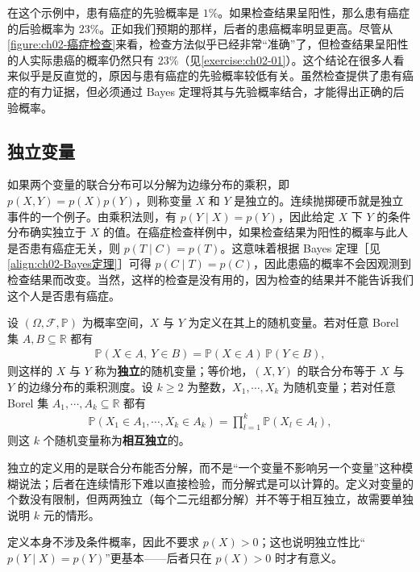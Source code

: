 \documentclass[../../main.tex]{subfiles}
\begin{document}
在这个示例中，患有癌症的先验概率是 $1\%$。如果检查结果呈阳性，那么患有癌症的后验概率为 $23\%$。正如我们预期的那样，后者的患癌概率明显更高。尽管从\cref{figure:ch02-癌症检查}来看，检查方法似乎已经非常“准确”了，但检查结果呈阳性的人实际患癌的概率仍然只有 $23\%$（见\cref{exercise:ch02-01}）。这个结论在很多人看来似乎是反直觉的，原因与患有癌症的先验概率较低有关。虽然检查提供了患有癌症的有力证据，但必须通过 Bayes 定理将其与先验概率结合，才能得出正确的后验概率。

\subsection{独立变量}\label{subsection:ch02-独立变量}

如果两个变量的联合分布可以分解为边缘分布的乘积，即 $p(X,Y)=p(X)p(Y)$，则称变量 $X$ 和 $Y$ 是独立的。连续抛掷硬币就是独立事件的一个例子。由乘积法则，有 $p(Y\mid X)=p(Y)$，因此给定 $X$ 下 $Y$ 的条件分布确实独立于 $X$ 的值。在癌症检查样例中，如果检查结果为阳性的概率与此人是否患有癌症无关，则 $p(T\mid C)=p(T)$。这意味着根据 Bayes 定理［见\eqref{align:ch02-Bayes定理}］可得 $p(C\mid T)=p(C)$，因此患癌的概率不会因观测到检查结果而改变。当然，这样的检查是没有用的，因为检查的结果并不能告诉我们这个人是否患有癌症。

\begin{definition}[独立变量]\label{definition:ch02-独立变量}
设 $(\Omega,\mathcal{F},\mathbb{P})$ 为概率空间，$X$ 与 $Y$ 为定义在其上的随机变量。若对任意 Borel 集 $A,B\subseteq\mathbb{R}$ 都有
\begin{align*}
  \mathbb{P}(X\in A,\ Y\in B)=\mathbb{P}(X\in A)\,\mathbb{P}(Y\in B),
\end{align*}
则这样的 $X$ 与 $Y$ 称为\textbf{独立}的随机变量；等价地，$(X,Y)$ 的联合分布等于 $X$ 与 $Y$ 的边缘分布的乘积测度。设 $k\geqslant2$ 为整数，$X_1,\cdots,X_k$ 为随机变量；若对任意 Borel 集 $A_1,\cdots,A_k\subseteq\mathbb{R}$ 都有
\begin{align*}
  \mathbb{P}(X_1\in A_1,\cdots,X_k\in A_k)=\prod_{l=1}^{k}\mathbb{P}(X_l\in A_l),
\end{align*}
则这 $k$ 个随机变量称为\textbf{相互独立}的。
\end{definition}

\begin{remark}
独立的定义用的是联合分布能否分解，而不是“一个变量不影响另一个变量”这种模糊说法；后者在连续情形下难以直接检验，而分解式是可以计算的。定义对变量的个数没有限制，但两两独立（每个二元组都分解）并不等于相互独立，故需要单独说明 $k$ 元的情形。

定义本身不涉及条件概率，因此不要求 $p(X)>0$；这也说明独立性比“$p(Y\mid X)=p(Y)$”更基本——后者只在 $p(X)>0$ 时才有意义。
\end{remark}
\end{document}
